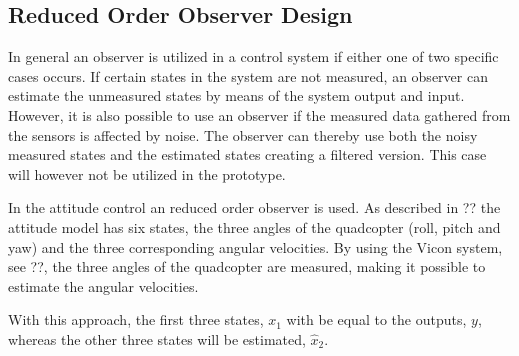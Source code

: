 \subsection{Reduced Order Observer Design}

In general an observer is utilized in a control system if either one of two specific cases occurs. If certain states in the system are not measured, an observer can estimate the unmeasured states by means of the system output and input. However, it is also possible to use an observer if the measured data gathered from the sensors is affected by noise.  The observer can thereby use both the noisy measured states and the estimated states creating a filtered version. This case will however not be utilized in the prototype.

In the attitude control an reduced order observer is used. As described in ?? the attitude model has six states, the three angles of the quadcopter (roll, pitch and yaw) and the three corresponding angular velocities. By using the Vicon system, see ??, the three angles of the quadcopter are measured, making it possible to estimate the angular velocities.

With this approach, the first three states, $x_1$ with be equal to the outputs, $y$, whereas the other three states will be estimated, $\hat{x}_2$.

